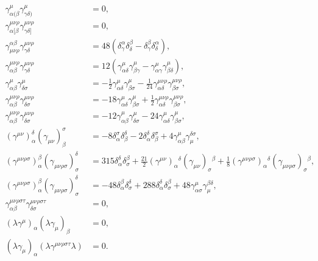 \begin{align}
		\gamma_{\alpha(\beta}^\mu \gamma_{\gamma\delta)}^\mu &= 0, \\
		\gamma_{\alpha[\beta}^{\mu\nu\rho} \gamma_{\gamma\delta]}^{\mu\nu\rho} &= 0, \\
		\gamma_{\mu\nu\rho}^{\alpha\beta} \gamma_{\gamma\delta}^{\mu\nu\rho} &= 48 \left( \delta_\gamma^\alpha \delta_\delta^\beta - \delta_\gamma^\beta \delta_\delta^\alpha \right), \\
		\gamma_{\alpha\beta}^{\mu\nu\rho} \gamma_{\gamma\delta}^{\mu\nu\rho} &= 12 \left( \gamma_{\alpha\delta}^\mu \gamma_{\beta\gamma}^\mu - \gamma_{\alpha\gamma}^\mu \gamma_{\beta\delta}^\mu \right), \\
		\gamma_{\alpha\beta}^\mu \gamma_{\delta\sigma}^\mu &= -\frac{1}{2} \gamma_{\alpha\delta}^\mu \gamma_{\beta\sigma}^\mu - \frac{1}{24} \gamma_{\alpha\delta}^{\mu\nu\rho} \gamma_{\beta\sigma}^{\mu\nu\rho}, \\
		\gamma_{\alpha\beta}^{\mu\nu\rho} \gamma_{\delta\sigma}^{\mu\nu\rho} &= -18 \gamma_{\alpha\delta}^\mu \gamma_{\beta\sigma}^\mu + \frac{1}{2} \gamma_{\alpha\delta}^{\mu\nu\rho} \gamma_{\beta\sigma}^{\mu\nu\rho}, \\
		\gamma_{\alpha\beta}^{\mu\nu\rho} \gamma_{\delta\sigma}^{\mu\nu\rho} &= -12 \gamma_{\alpha\beta}^\mu \gamma_{\delta\sigma}^\mu - 24 \gamma_{\alpha\delta}^\mu \gamma_{\beta\sigma}^\mu, \\
		(\gamma^{\mu\nu})_\alpha^\delta (\gamma_{\mu\nu})_\beta^\sigma &= -8 \delta_\alpha^\sigma \delta_\beta^\delta - 2 \delta_\alpha^\delta \delta_\beta^\sigma + 4 \gamma_{\alpha\beta}^\mu \gamma_\mu^{\delta\sigma}, \\
		(\gamma^{\mu\nu\rho\sigma})_\alpha^\beta (\gamma_{\mu\nu\rho\sigma})_\sigma^\delta &= 315 \delta_{\alpha}^{\delta} \delta_{\sigma}^{\beta} + \frac{21}{2} (\gamma^{\mu\nu})_{\alpha}{}^{\delta} (\gamma_{\mu\nu})_{\sigma}{}^{\beta} + \frac{1}{8} (\gamma^{\mu\nu\rho\sigma})_{\alpha}{}^{\delta} (\gamma_{\mu\nu\rho\sigma})_{\sigma}{}^{\beta}, \\
		(\gamma^{\mu\nu\rho\sigma})_{\alpha}^{\beta} (\gamma_{\mu\nu\rho\sigma})_{\sigma}^{\delta} &= -48 \delta_\alpha^\beta \delta_\sigma^\delta + 288 \delta_\alpha^\delta \delta_\sigma^\beta + 48 \gamma_{\alpha\sigma}^\mu \gamma_\mu^{\beta\delta},\\
		\gamma_{\alpha\beta}^{\mu\nu\rho\sigma\tau} \gamma_{\delta\sigma}^{\mu\nu\rho\sigma\tau} &= 0, \\
		(\lambda \gamma^\mu)_\alpha (\lambda \gamma_\mu)_\beta &= 0, \\
		(\lambda \gamma_\mu)_\alpha (\lambda \gamma^{\mu\nu\rho\sigma\tau} \lambda) &= 0.
\end{align}
